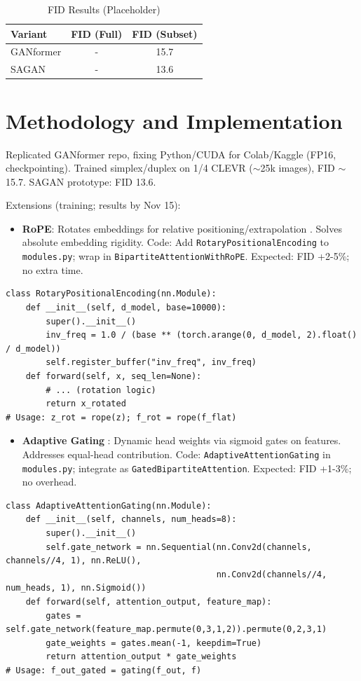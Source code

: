 \documentclass[12pt,a4paper]{article}
\begin{document}
\begin{table}[H]
\centering
\caption{FID Results (Placeholder)}
\begin{tabular}{lcc}
\toprule
Variant & FID (Full) & FID (Subset) \\
\midrule
GANformer & - & 15.7 \\
SAGAN &  - & 13.6 \\
\bottomrule
\end{tabular}
\label{tab:fid}
\end{table}


\section{Methodology and Implementation}

Replicated GANformer repo, fixing Python/CUDA for Colab/Kaggle (FP16, checkpointing). Trained simplex/duplex on 1/4 CLEVR ($\sim$25k images), FID $\sim$ 15.7. SAGAN prototype: FID 13.6.

Extensions (training; results by Nov 15):
\begin{itemize}
    \item \textbf{RoPE}: Rotates embeddings for relative positioning/extrapolation \citep{su2021roformer}. Solves absolute embedding rigidity. Code: Add \texttt{RotaryPositionalEncoding} to \texttt{modules.py}; wrap in \texttt{BipartiteAttentionWithRoPE}. Expected: FID +2-5\%; no extra time.
\end{itemize}

\begin{lstlisting}[caption={RoPE Implementation}]
class RotaryPositionalEncoding(nn.Module):
    def __init__(self, d_model, base=10000):
        super().__init__()
        inv_freq = 1.0 / (base ** (torch.arange(0, d_model, 2).float() / d_model))
        self.register_buffer("inv_freq", inv_freq)
    def forward(self, x, seq_len=None):
        # ... (rotation logic)
        return x_rotated
# Usage: z_rot = rope(z); f_rot = rope(f_flat)
\end{lstlisting}

\begin{itemize}
    \item \textbf{Adaptive Gating }: Dynamic head weights via sigmoid gates on features. Addresses equal-head contribution. Code: \texttt{AdaptiveAttentionGating} in \texttt{modules.py}; integrate as \texttt{GatedBipartiteAttention}. Expected: FID +1-3\%; no overhead.
\end{itemize}

\begin{lstlisting}[caption={Adaptive Gating Implementation}]
class AdaptiveAttentionGating(nn.Module):
    def __init__(self, channels, num_heads=8):
        super().__init__()
        self.gate_network = nn.Sequential(nn.Conv2d(channels, channels//4, 1), nn.ReLU(),
                                          nn.Conv2d(channels//4, num_heads, 1), nn.Sigmoid())
    def forward(self, attention_output, feature_map):
        gates = self.gate_network(feature_map.permute(0,3,1,2)).permute(0,2,3,1)
        gate_weights = gates.mean(-1, keepdim=True)
        return attention_output * gate_weights
# Usage: f_out_gated = gating(f_out, f)
\end{lstlisting}
\end{document}
